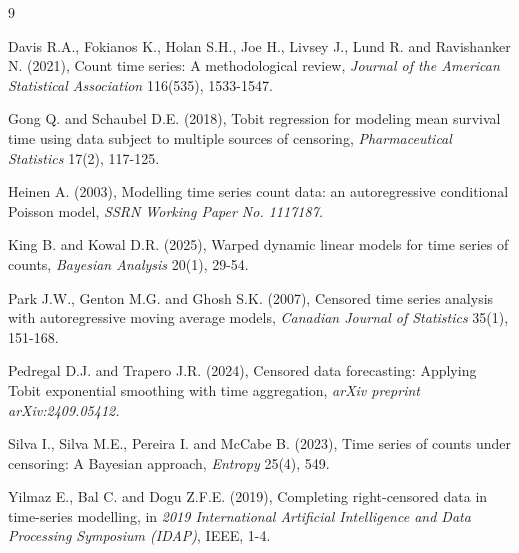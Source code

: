 \documentclass[10pt,twoside]{article}
\numberwithin{equation}{section}
\begin{document}
\begin{thebibliography}{9}




Davis R.A., Fokianos K., Holan S.H., Joe H., Livsey J., Lund R. and Ravishanker N. (2021), Count time series: A methodological review, {\it Journal of the American Statistical Association} 116(535), 1533-1547.




Gong Q. and Schaubel D.E. (2018), Tobit regression for modeling mean survival time using data subject to multiple sources of censoring, {\it Pharmaceutical Statistics} 17(2), 117-125.




Heinen A. (2003), Modelling time series count data: an autoregressive conditional Poisson model, {\it SSRN Working Paper No. 1117187.}




King B. and Kowal D.R. (2025), Warped dynamic linear models for time series of counts, {\it Bayesian Analysis} 20(1), 29-54.




Park J.W., Genton M.G. and Ghosh S.K. (2007), Censored time series analysis with autoregressive moving average models, {\it Canadian Journal of Statistics} 35(1), 151-168.




Pedregal D.J. and Trapero J.R. (2024), Censored data forecasting: Applying Tobit exponential smoothing with time aggregation, {\it arXiv preprint arXiv:2409.05412.}




Silva I., Silva M.E., Pereira I. and McCabe B. (2023), Time series of counts under censoring: A Bayesian approach, {\it Entropy} 25(4), 549.




Yilmaz E., Bal C. and Dogu Z.F.E. (2019), Completing right-censored data in time-series modelling, in {\it 2019 International Artificial Intelligence and Data Processing Symposium (IDAP)}, IEEE, 1-4.

\end{thebibliography}
\end{document}
